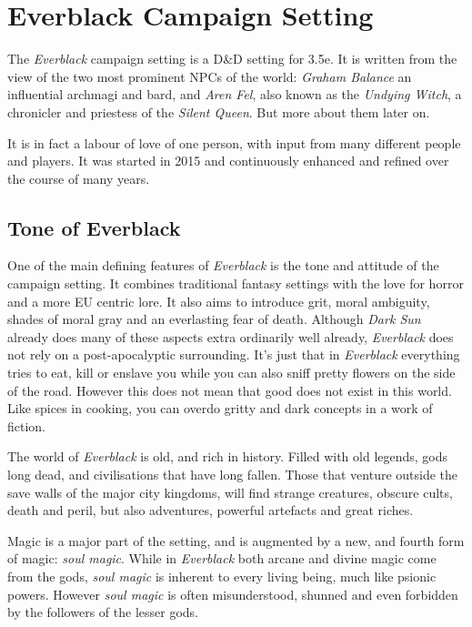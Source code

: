 \chapter{Everblack Campaign Setting}

The \emph{Everblack} campaign setting is a D\&D setting for 3.5e.  It is
written from the view of the two most prominent NPCs of the world:
\emph{Graham Balance} an influential archmagi and bard, and \emph{Aren Fel},
also known as the \emph{Undying Witch}, a chronicler and priestess of the
\emph{Silent Queen}. But more about them later on.

It is in fact a labour of love of one person, with input from many different
people and players. It was started in 2015 and continuously enhanced and
refined over the course of many years.

\section{Tone of Everblack}

One of the main defining features of \emph{Everblack} is the tone and attitude
of the campaign setting. It combines traditional fantasy settings with the love
for horror and a more EU centric lore. It also aims to introduce grit, moral
ambiguity, shades of moral gray and an everlasting fear of
death. Although \emph{Dark Sun} already does many of these aspects extra
ordinarily well already, \emph{Everblack} does not rely on a
post-apocalyptic surrounding. It's just that in \emph{Everblack} everything
tries to eat, kill or enslave you while you can also sniff pretty flowers on
the side of the road. However this does not mean that good does not exist in
this world. Like spices in cooking, you can overdo gritty and dark concepts in
a work of fiction.

The world of \emph{Everblack} is old, and rich in history. Filled with old
legends, gods long dead, and civilisations that have long fallen. Those that
venture outside the save walls of the major city kingdoms, will find strange
creatures, obscure cults, death and peril, but also adventures, powerful
artefacts and great riches.

Magic is a major part of the setting, and is augmented by a new, and fourth
form of magic: \emph{soul magic}. While in \emph{Everblack} both arcane and
divine magic come from the gods, \emph{soul magic} is inherent to every living
being, much like psionic powers. However \emph{soul magic} is often
misunderstood, shunned and even forbidden by the followers of the lesser gods.

